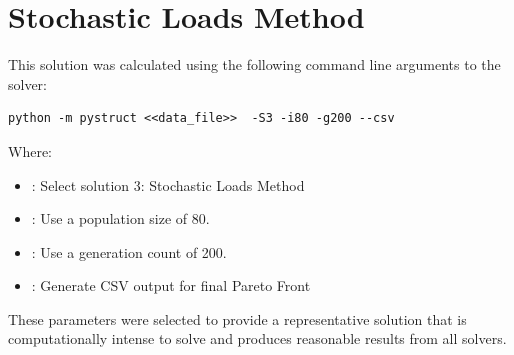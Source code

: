 \section{Stochastic Loads Method}
This solution was calculated using the following command line arguments to the solver: 

\begin{verbatim}
python -m pystruct <<data_file>>  -S3 -i80 -g200 --csv
\end{verbatim}

\noindent Where: 

\begin{itemize}
  \item {}: Select solution 3: Stochastic Loads Method
  \item {}: Use a population size of 80. 
  \item {}: Use a generation count of 200. 
  \item {}: Generate CSV output for final Pareto Front
\end{itemize}

These parameters were selected to provide a representative solution that is computationally intense to solve and produces reasonable results from all solvers. 

